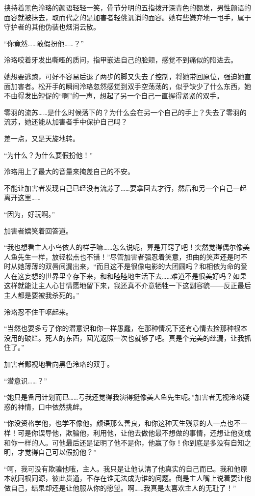 \documentclass[UTF8, scheme = chinese, openany]{ctexbook}
\begin{document}
挟持着黑色泠珞的颜语轻轻一笑，骨节分明的五指拨开深青色的额发，男性颜语的面容就被抹去，取而代之的是加害者轻佻讥诮的面容。她有些嫌弃地一甩手，属于守护者的其他伪装也烟消云散。

“你竟然……敢假扮他……？”

泠珞咬着牙发出嘶哑的质问，指甲嵌进自己的脸颊，感觉不到痛似的陷进去。

她想要逃跑，可好不容易后退了两步的脚又失去了控制，将她带回原位，强迫她直面加害者。松开手的瞬间泠珞忽然感觉到双手空荡荡的，似乎缺少了什么东西，她不由得发出短促的“啊”的一声，想起了另一个自己一直握得紧紧的双手。

零羽的流苏……是什么时候落下的？为什么会在另一个自己的手上？失去了零羽的流苏，她还能从加害者手中保护自己吗？

差一点，又是天旋地转。

“为什么？为什么要假扮他！”

泠珞用上了最大的音量来掩盖自己的不安。

不能让加害者发现自己已经没有流苏了……要拿回去才行，然后和另一个自己一起离开这里……

“因为，好玩啊。”

加害者嬉笑着回答道。

“我也想看主人小鸟依人的样子嘛……怎么说呢，算是开窍了吧！突然觉得偶尔像美人鱼先生一样，放轻松点也不错！”尽管加害者强忍着笑意，扭曲的笑声还是时不时从她薄薄的双唇间漏出来，“而且这不是很像电影的大团圆吗？和相依为命的爱人在这妄想的世界里幸存下来，和和睦睦地生活下去……难道不是很美好吗？如果这样就能让主人心甘情愿地留下来，我还真不介意牺牲一下这副容貌——反正最后主人都是要被我杀死的。”

泠珞忍不住干呕起来。

“当然也要多亏了你的潜意识和你一样愚蠢，在那种情况下还有心情去捡那种根本没用的破烂。死人的东西，回光返照一次也就够了吧。真是个完美的纰漏，让我抓住了。”

加害者鄙视地看向黑色泠珞的双手。

“潜意识……？”

“她只是备用计划而已……亏我还觉得我演得挺像美人鱼先生呢。”加害者无视泠珞疑惑的神情，口中依然挑衅。

“你没资格学他，也学不像他。颜语那么善良，和你这种天生残暴的人一点也不一样！可是你误导他，欺骗他，利用他，让他去做他最不想做的事情，还想让他变成和你一样的人。可他最后还是证明了他不是你，他赢了你！你到底是多没有自知之明，才觉得自己可以假扮他？”

“呵，我可没有欺骗他哦，主人。我只是让他认清了他真实的自己而已。我和他原本就同根同源，彼此贯通，不存在谁无法成为谁的问题。倒是主人嘴上说着要让他做自己，结果却还是让他服从你的愿望。啊……我真是太喜欢主人的无耻了！”
\end{document}
